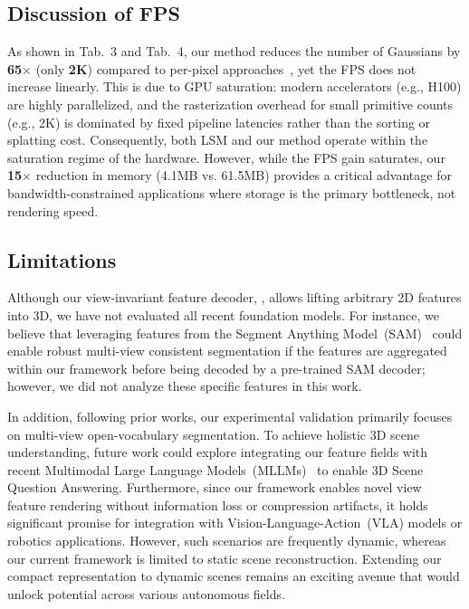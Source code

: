 \subsection{Discussion of FPS}
As shown in Tab.~\textcolor[HTML]{367DBD}{3} and Tab.~\textcolor[HTML]{367DBD}{4}, our method reduces the number of Gaussians by \textbf{65$\times$} (only \textbf{2K}) compared to per-pixel approaches~\cite{fan2024large,ye2024no}, yet the FPS does not increase linearly. This is due to GPU saturation: modern accelerators (e.g., H100) are highly parallelized, and the rasterization overhead for small primitive counts (e.g., 2K) is dominated by fixed pipeline latencies rather than the sorting or splatting cost. Consequently, both LSM and our method operate within the saturation regime of the hardware. However, while the FPS gain saturates, our \textbf{15$\times$} reduction in memory (4.1MB vs. 61.5MB) provides a critical advantage for bandwidth-constrained applications where storage is the primary bottleneck, not rendering speed.

\subsection{Limitations}
Although our view-invariant feature decoder, \oursF, allows lifting arbitrary 2D features into 3D, we have not evaluated all recent foundation models. For instance, we believe that leveraging features from the Segment Anything Model~(SAM)~\cite{kirillov2023segment} could enable robust multi-view consistent segmentation if the features are aggregated within our framework before being decoded by a pre-trained SAM decoder; however, we did not analyze these specific features in this work.

In addition, following prior works, our experimental validation primarily focuses on multi-view open-vocabulary segmentation. To achieve holistic 3D scene understanding, future work could explore integrating our feature fields with recent Multimodal Large Language Models~(MLLMs)~\cite{liu2023visual,liu2024improved} to enable 3D Scene Question Answering. Furthermore, since our framework enables novel view feature rendering without information loss or compression artifacts, it holds significant promise for integration with Vision-Language-Action~(VLA) models or robotics applications. However, such scenarios are frequently dynamic, whereas our current framework is limited to static scene reconstruction. Extending our compact representation to dynamic scenes remains an exciting avenue that would unlock potential across various autonomous fields.
